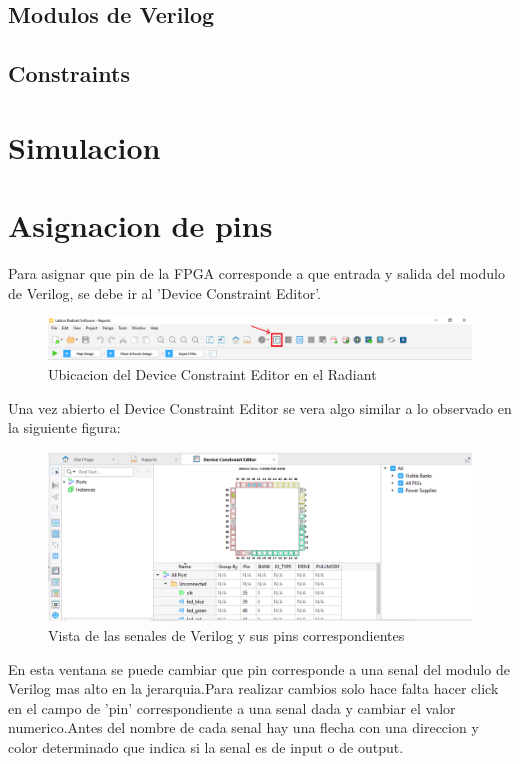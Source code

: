 \documentclass{article}
\begin{document}
\subsection{Modulos de Verilog}
\subsection{Constraints}

\section{Simulacion}

\section{Asignacion de pins}
Para asignar que pin de la FPGA corresponde a que entrada y salida del modulo de Verilog, se debe ir al 'Device Constraint Editor'.
	\begin{figure}[H]
	\includegraphics[width=\textwidth]{Imagenes/pins.png}
	\caption{Ubicacion del Device Constraint Editor en el Radiant}
	\end{figure}
	
 Una vez abierto el Device Constraint Editor se vera algo similar a lo observado en la siguiente figura:
 	\begin{figure}[H]
	\includegraphics[width=\textwidth]{Imagenes/DeviceConstraintEditor.png}
	\caption{Vista de las senales de Verilog y sus pins correspondientes}
	\end{figure}
 En esta ventana se puede cambiar que pin corresponde a una senal del modulo de Verilog mas alto en la jerarquia.Para realizar cambios solo hace falta hacer click en el campo de 'pin' correspondiente a una senal dada y cambiar el valor numerico.Antes del nombre de cada senal hay una flecha con una direccion y color determinado que indica si la senal es de input o de output.
 
\end{document}
